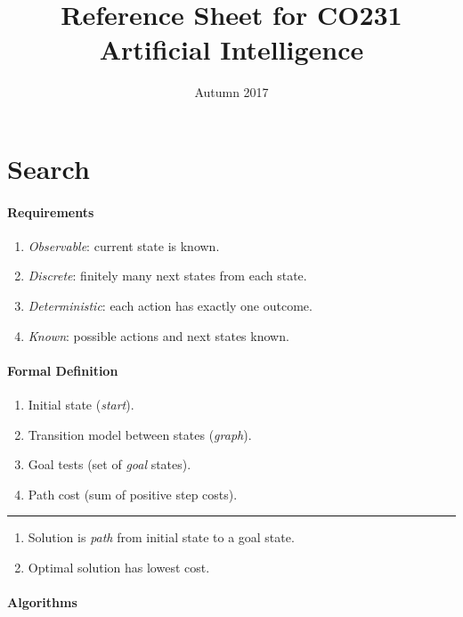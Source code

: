 \documentclass[twocolumn,english]{article}
\begin{document}
\title{Reference Sheet for CO231 Artificial Intelligence}

\date{Autumn 2017}
\maketitle

\section{Search}

\paragraph{Requirements}
\begin{enumerate}
\item \emph{Observable}: current state is known.
\item \emph{Discrete}: finitely many next states from each state.
\item \emph{Deterministic}: each action has exactly one outcome.
\item \emph{Known}: possible actions and next states known.
\end{enumerate}

\paragraph{Formal Definition}
\begin{enumerate}
\item Initial state (\emph{start}).
\item Transition model between states (\emph{graph}).
\item Goal tests (set of \emph{goal} states).
\item Path cost (sum of positive step costs).
\end{enumerate}
\rule[0.5ex]{0.25\columnwidth}{0.5pt}
\begin{enumerate}
\item Solution is \emph{path} from initial state to a goal state.
\item Optimal solution has lowest cost.
\end{enumerate}

\paragraph{Algorithms}
\end{document}

